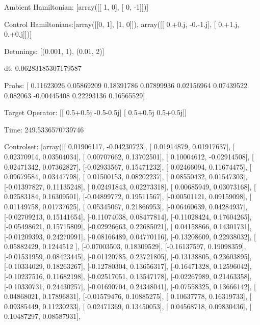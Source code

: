\documentclass{article}
\begin{document}
    

\newpage

Ambient Hamiltonian: [array([[ 1,  0],
       [ 0, -1]])]

Control Hamiltonians:[array([[0, 1],
       [1, 0]]), array([[ 0.+0.j, -0.-1.j],
       [ 0.+1.j,  0.+0.j]])]

Detunings: [(0.001, 1), (0.01, 2)]

 dt: 0.06283185307179587

Probs: [ 0.11623026  0.05869209  0.18391786  0.07899936  0.02156964  0.07439522
  0.082063   -0.00445408  0.22293136  0.16565529]

Target Operator: [[ 0.5+0.5j -0.5-0.5j]
 [ 0.5+0.5j  0.5+0.5j]]

Time: 249.5336570739746

Controlset: [array([[ 0.01906117, -0.04230723],
       [ 0.01914879,  0.01917637],
       [ 0.02370914,  0.03504034],
       [ 0.00707662,  0.13702501],
       [ 0.10004612, -0.02914508],
       [ 0.02471342,  0.07362827],
       [-0.02933567,  0.15471232],
       [ 0.02466094,  0.11674475],
       [ 0.09679584,  0.03447798],
       [ 0.01500153,  0.08202237],
       [ 0.08550432,  0.01547303],
       [-0.01397827,  0.11135248],
       [ 0.02491843,  0.02273318],
       [ 0.00685949,  0.03073168],
       [ 0.02583184,  0.16309501],
       [-0.04899772,  0.19511567],
       [-0.00501121,  0.09159098],
       [ 0.01149758,  0.01737625],
       [ 0.05345067,  0.21866953],
       [-0.06460639,  0.04284937],
       [-0.02709213,  0.15141654],
       [-0.11074038,  0.08477814],
       [-0.11028424,  0.17604265],
       [-0.05498621,  0.15715809],
       [-0.02926663,  0.22685021],
       [ 0.04158866,  0.14301731],
       [-0.01209393,  0.24270991],
       [-0.08166489,  0.04770116],
       [-0.13208609,  0.22938032],
       [ 0.05882429,  0.1244512 ],
       [-0.07003503,  0.18309529],
       [-0.16137597,  0.19098359],
       [-0.01531959,  0.08423445],
       [-0.01120785,  0.23721805],
       [-0.13138805,  0.23603895],
       [-0.10334029,  0.18263267],
       [-0.12780304,  0.13656317],
       [-0.16471328,  0.12596042],
       [-0.10237516,  0.11682198],
       [-0.02517051,  0.13547178],
       [-0.02267989,  0.21463358],
       [-0.10330731,  0.24430257],
       [-0.01690704,  0.24348041],
       [-0.07558325,  0.13666142],
       [ 0.04868021,  0.17896831],
       [-0.01579476,  0.10885275],
       [ 0.10637778,  0.16319733],
       [ 0.09385449,  0.11230233],
       [ 0.02471369,  0.13450053],
       [ 0.04568718,  0.09830436],
       [ 0.10487297,  0.08587931],
\end{document}
